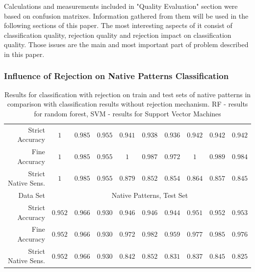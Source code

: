 \documentclass{llncs}
\begin{document}
Calculations and measurements included in "Quality Evaluation" section were based on confusion matrixes. Information gathered from them will be used in the following sections of this paper. The most interesting aspects of it consist of classification quality, rejection quality and rejection impact on classification quality. Those issues are the main and most important part of problem described in this paper.

\subsubsection{Influence of Rejection on Native Patterns Classification}


\begin{table}[h]
\centering
\caption{Results for classification with rejection on train and test sets of native patterns in comparison with classification results without rejection mechanism. RF - results for random forest, SVM - results for Support Vector Machines
}
\setlength{\tabcolsep}{3pt}
\renewcommand{\arraystretch}{1}
{\footnotesize
\begin{tabular}{|r||c|c|c||c|c|c||c|c|c|}
\hline
Strict Accuracy & $1$ & $0.985$ & $0.955$ & $0.941$ & $0.938$ & $0.936$ & $0.942$ & $0.942$ & $0.942$ \\
Fine Accuracy       & $1$ & $0.985$ & $0.955$ & $1$     & $0.987$ & $0.972$ & $1$ & $0.989$ & $0.984$ \\
Strict Native Sens. & $1$ & $0.985$ & $0.955$ & $0.879$ & $0.852$ & $0.854$ & $0.864$ & $0.857$ & $0.845$ \\
\hline
Data Set & \multicolumn{9}{c|}{Native Patterns, Test Set} \\
\hline
Strict Accuracy  & $0.952$ & $0.966$ & $0.930$ & $0.946$ & $0.946$ & $0.944$ & $0.951$ & $0.952$ & $0.953$ \\
Fine Accuracy       & $0.952$ & $0.966$ & $0.930$ & $0.972$ & $0.982$ & $0.959$ & $0.977$ & $0.985$ & $0.976$ \\
Strict Native Sens. & $0.952$ & $0.966$ & $0.930$ & $0.842$ & $0.852$ & $0.831$ & $0.837$ & $0.845$ & $0.825$ \\
\hline
\end{tabular}
}


\vspace{-6pt}
\label{tab:NativeNoForeign}
\end{table}
\end{document}

